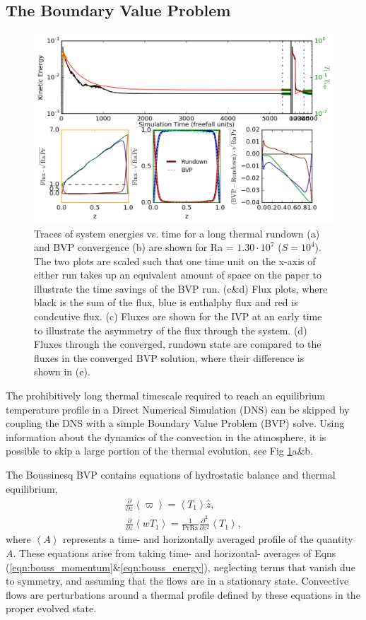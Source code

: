 \documentclass[aps, pre, onecolumn, nofootinbib, notitlepage, groupedaddress, amsfonts, amssymb, amsmath, longbibliography]{revtex4-1}
\newcommand{\angles}[1]{\ensuremath{\left\langle #1 \right\rangle}}
\begin{document}
\subsection{The Boundary Value Problem}
\begin{figure}[b]
\includegraphics[width=\textwidth]{./figs/time_trace.png}
\caption{Traces of system energies vs. time for a long thermal rundown (a) and BVP convergence
(b) are shown for Ra = $1.30 \cdot 10^7$ ($S = 10^4$).  The two plots are scaled such that
one time unit on the x-axis of either run takes up an equivalent amount of space on the paper
to illustrate the time savings of the BVP run.  (c\&d) Flux plots, where black is the sum of the
flux, blue is enthalphy flux and red is condcutive flux. (c) Fluxes are shown for the IVP at an early
time to illustrate the asymmetry of the flux through the system. (d) Fluxes through the converged,
rundown state are compared to the fluxes in the converged BVP solution, where their difference
is shown in (e). \label{fig:time_trace} }
\end{figure}

The prohibitively long thermal timescale required to reach an equilibrium temperature profile
in a Direct Numerical Simulation (DNS) can be skipped by coupling the DNS with a simple Boundary Value Problem
(BVP) solve. Using information about the dynamics of the convection in the atmosphere, it is possible
to skip a large portion of the thermal evolution, see Fig \ref{fig:time_trace}a\&b.

The Boussinesq BVP contains equations of hydrostatic balance and thermal equilibrium,
\begin{gather}
\frac{\partial}{\partial z}\angles{\varpi} = \angles{T_1}\hat{z},
	\label{eqn:bouss_BVP_momentum}
\\
\frac{\partial}{\partial z}\angles{wT_1} = \frac{1}{\text{Pr}\text{Ra}}\frac{\partial^2}{\partial z^2} \angles{T_1},
	\label{eqn:bouss_BVP_energy}
\end{gather}
where $\angles{A}$ represents a time- and horizontally averaged profile of the quantity $A$.  
These
equations arise from taking time- and horizontal- averages of Eqns (\ref{eqn:bouss_momentum}\&\ref{eqn:bouss_energy}),
neglecting terms that vanish due to symmetry, and assuming that the flows are in a stationary state.  
Convective flows
are perturbations around a thermal profile defined by these equations in the proper evolved state.
\end{document}
